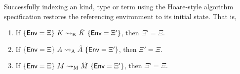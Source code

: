 \begin{corollary}
Successfully indexing an \LF kind, type or term using the Hoare-style algorithm specification restores the referencing environment to its initial state.
That is,
\begin{enumerate}
\item If $\{\mathsf{Env} = \Xi\}\ K \rightsquigarrow_{{\normalfont\text{K}}} \tilde K\ \{\mathsf{Env} = \Xi'\}$, then $\Xi' = \Xi$.
\item If $\{\mathsf{Env} = \Xi\}\ A \rightsquigarrow_{{\normalfont\text{A}}} \tilde A\ \{\mathsf{Env} = \Xi'\}$, then $\Xi' = \Xi$.
\item If $\{\mathsf{Env} = \Xi\}\ M \rightsquigarrow_{{\normalfont\text{M}}} \tilde M\ \{\mathsf{Env} = \Xi'\}$, then $\Xi' = \Xi$.
\end{enumerate}
\end{corollary}

